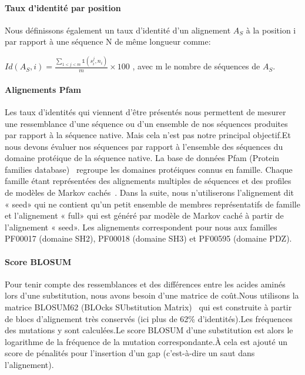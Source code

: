 \paragraph{Taux d'identité par position}

Nous définissons également un taux d'identité d'un alignement $A_S$  à la position i par rapport à une séquence N de même longueur comme:

$Id(A_{S},i) = \frac{\sum_{1<j<m} \mathds{1}(s_i^j,n_i)}{m} \times 100$ , avec m le nombre de séquences de $A_S$.

\paragraph{Alignements Pfam} 
Les taux d'identités qui viennent d'être présentés nous permettent de mesurer une ressemblance d'une séquence ou d'un ensemble de nos séquences produites par rapport à la séquence native. Mais cela n'est pas notre principal objectif.Et nous devons évaluer nos séquences par rapport à l'ensemble des séquences du domaine protéique de la séquence native.  
La base de données Pfam (Protein families database)~\citep{refPfam} regroupe les domaines protéiques connus en famille. Chaque famille  étant représentées des alignements multiples de séquences et des profiles de modèles de Markov cachés~\citep{refPfam}. Dans la suite, nous n'utiliserons l'alignement dit « seed» qui ne contient qu'un petit ensemble de membres représentatifs de famille et l'alignement « full» qui est généré par modèle de Markov caché à partir de l'alignement « seed». Les alignements correspondent pour nous aux familles PF00017 (domaine SH2), PF00018  (domaine SH3) et PF00595 (domaine PDZ).

\paragraph{Score BLOSUM}

Pour tenir compte des ressemblances et des différences entre les acides aminés lors d'une substitution, nous avons besoin d'une matrice de coût.Nous utilisons la matrice BLOSUM62 (BLOcks SUbstitution Matrix)~\citep{refBLOSUM} qui est construite à partir de blocs d'alignement très conservés (ici plus de 62\% d'identités).Les fréquences des mutations y sont calculées.Le score BLOSUM d'une substitution est alors le logarithme de la fréquence de la mutation correspondante.À cela est ajouté un score de pénalités pour l'insertion d'un gap (c'est-à-dire un saut dans l'alignement).

